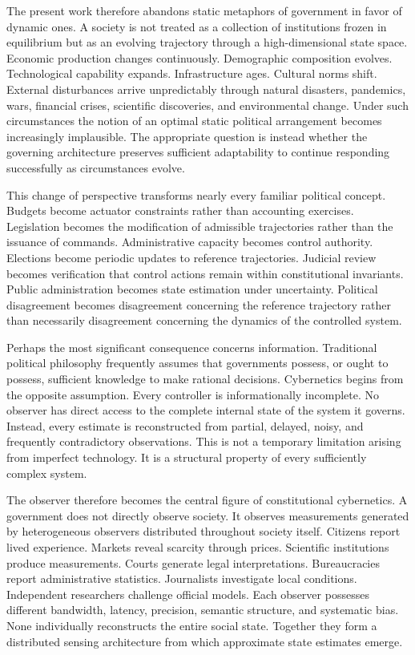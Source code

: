 \documentclass[12pt,a4paper]{article}
\begin{document}
The present work therefore abandons static metaphors of government in favor of dynamic ones. A society is not treated as a collection of institutions frozen in equilibrium but as an evolving trajectory through a high-dimensional state space. Economic production changes continuously. Demographic composition evolves. Technological capability expands. Infrastructure ages. Cultural norms shift. External disturbances arrive unpredictably through natural disasters, pandemics, wars, financial crises, scientific discoveries, and environmental change. Under such circumstances the notion of an optimal static political arrangement becomes increasingly implausible. The appropriate question is instead whether the governing architecture preserves sufficient adaptability to continue responding successfully as circumstances evolve.

This change of perspective transforms nearly every familiar political concept. Budgets become actuator constraints rather than accounting exercises. Legislation becomes the modification of admissible trajectories rather than the issuance of commands. Administrative capacity becomes control authority. Elections become periodic updates to reference trajectories. Judicial review becomes verification that control actions remain within constitutional invariants. Public administration becomes state estimation under uncertainty. Political disagreement becomes disagreement concerning the reference trajectory rather than necessarily disagreement concerning the dynamics of the controlled system.

Perhaps the most significant consequence concerns information. Traditional political philosophy frequently assumes that governments possess, or ought to possess, sufficient knowledge to make rational decisions. Cybernetics begins from the opposite assumption. Every controller is informationally incomplete. No observer has direct access to the complete internal state of the system it governs. Instead, every estimate is reconstructed from partial, delayed, noisy, and frequently contradictory observations. This is not a temporary limitation arising from imperfect technology. It is a structural property of every sufficiently complex system.

The observer therefore becomes the central figure of constitutional cybernetics. A government does not directly observe society. It observes measurements generated by heterogeneous observers distributed throughout society itself. Citizens report lived experience. Markets reveal scarcity through prices. Scientific institutions produce measurements. Courts generate legal interpretations. Bureaucracies report administrative statistics. Journalists investigate local conditions. Independent researchers challenge official models. Each observer possesses different bandwidth, latency, precision, semantic structure, and systematic bias. None individually reconstructs the entire social state. Together they form a distributed sensing architecture from which approximate state estimates emerge.
\end{document}
